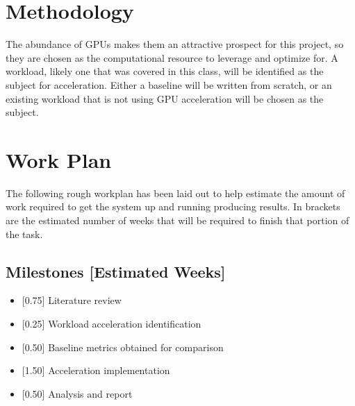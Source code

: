 \documentclass[10pt, oneside, letterpaper]{article}
\begin{document}
\section{Methodology}

The abundance of GPUs makes them an attractive prospect for this project, so they are chosen as the computational resource to leverage and optimize for. A workload, likely one that was covered in this class, will be identified as the subject for acceleration. Either a baseline will be written from scratch, or an existing workload that is not using GPU acceleration will be chosen as the subject.

\section{Work Plan}

The following rough workplan has been laid out to help estimate the amount of work required to get the system up and running producing results. In brackets are the estimated number of weeks that will be required to finish that portion of the task.

\subsection{Milestones [Estimated Weeks]}

\begin{itemize}
  \item {[0.75]} Literature review
  \item {[0.25]} Workload acceleration identification
  \item {[0.50]} Baseline metrics obtained for comparison
  \item {[1.50]} Acceleration implementation
  \item {[0.50]} Analysis and report
\end{itemize}

\nocite{*}



\end{document}
